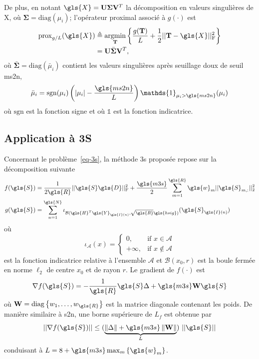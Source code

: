 De plus, en notant $\gls{X}=\mathbf{U}\boldsymbol{\Sigma} \mathbf{V}^T$ la décomposition en valeurs singulières de \gls{X}, où $\boldsymbol{\Sigma} = \mathrm{diag}(\mu_i)$; l'opérateur proximal associé à $g(\cdot)$ est~\cite{cai1956singular}
\begin{align}
    \mathrm{prox}_{g/L}(\gls{X}) &\triangleq \argmin_{\mathbf{T}} 
                                    \left\{ \frac{g(\mathbf{T})}{L} + \frac{1}{2}\frobnorm{\mathbf{T} - \gls{X}} \right\}\\
                               &= {\mathbf{U}} \bar{\boldsymbol{\Sigma}} {\mathbf{V}}^T,
\end{align}
où $\bar{\boldsymbol{\Sigma}} = \mathrm{diag}(\bar{\mu}_i)$ contient les valeurs singulières après seuillage doux de seuil \gls{ms2n}, \ie{}
\begin{equation}
    \bar{\mu}_i = \mathrm{sgn}(\mu_i)\left(|\mu_i|-\frac{\gls{ms2n}}{L}\right)\mathds{1}_{\mu_i>\gls{ms2n}}(\mu_i)
\end{equation}
où $\mathrm{sgn}$ est la fonction signe et où $\mathds{1}$ est la fonction indicatrice.


\subsection{Application à 3S}\label{subsec-implementation-3s}

Concernant le problème~\eqref{eq-3s}, la méthode \gls{3s} proposée repose sur la décomposition suivante
\begin{align}
    f(\gls{S}) &= 
    \frac{1}{2\gls{R}}\frobnorm{\gls{S} \gls{D}} + 
    \frac{\gls{m3s}}{2}\sum_{m=1}^{\gls{R}} \gls{w}_{m} \twonorm{\gls{S}_{m,:}}\\
    g(\gls{S}) &= 
    \sum_{n=1}^{\gls{N}} \iota_{
        \mathcal{B}(\gls{H}^T\gls{Y}_{\gls{I}(n)},\sqrt{\gls{R}}\gls{hsig})
    }(\gls{S}_{\gls{I}(n)})
    \label{eq-3S_g}
\end{align}
où
\begin{equation}
    \iota_\mathcal{A}(x) = \left\{\begin{array}{lr}
    0,        & \text{if } x\in   \mathcal{A}\\
    +\infty, & \text{if } x\notin\mathcal{A}
    \end{array}\right.
\end{equation}
est la fonction indicatrice relative à l'ensemble $\mathcal{A}$ et $\mathcal{B}(x_0,r)$ est la boule fermée en norme $\ell_2$ de centre $x_0$ et de rayon $r$.
Le gradient de $f(\cdot)$ est
\begin{equation}
    \nabla f(\gls{S}) = -\frac{1}{\gls{R}} \gls{S}\Delta + \gls{m3s}\mathbf{W}\gls{S}\\
\end{equation}
où $\mathbf{W}=\mathrm{diag}\left\{w_1,\ldots,w_{\gls{R}}\right\}$ est la matrice diagonale contenant les poids.
De manière similaire à \gls{s2n}, une borne supérieure de $L_f$ est obtenue par
\begin{equation}
||\nabla f(\gls{S})|| \leq 
(\underbrace{\left\|\Delta\right\| + \gls{m3s}\left\|\mathbf{W}\right\|}_{L})
\ ||\gls{S}||
\end{equation}
conduisant à $L = 8+\gls{m3s}\max_{m}\left\{\gls{w}_{m}\right\}$.

